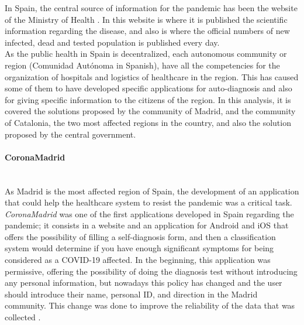 \documentclass[a4paper, 12pt]{article}
\begin{document}
In Spain, the central source of information for the pandemic has been the website of the Ministry of Health \cite{ministerio-sanidad}. In this website is where it is published the scientific information regarding the disease, and also is where the official numbers of new infected, dead and tested population is published every day.\\

As the public health in Spain is decentralized, each autonomous community or region (Comunidad Autónoma in Spanish), have all the competencies for the organization of hospitals and logistics of healthcare in the region. This has caused some of them to have developed specific applications for auto-diagnosis and also for giving specific information to the citizens of the region. In this analysis, it is covered the solutions proposed by the community of Madrid, and the community of Catalonia, the two most affected regions in the country, and also the solution proposed by the central government.

\paragraph{CoronaMadrid} \mbox{}\\

As Madrid is the most affected region of Spain, the development of an application that could help the healthcare system to resist the pandemic was a critical task. \textit{CoronaMadrid} \cite{coronamadrid-page} was one of the first applications developed in Spain regarding the pandemic; it consists in a website and an application for Android and iOS that offers the possibility of filling a self-diagnosis form, and then a classification system would determine if you have enough significant symptoms for being considered as a COVID-19 affected. In the beginning, this application was permissive, offering the possibility of doing the diagnosis test without introducing any personal information, but nowadays this policy has changed and the user should introduce their name, personal ID, and direction in the Madrid community. This change was done to improve the reliability of the data that was collected \cite{coronamadrid-privacy}. \\
\end{document}
